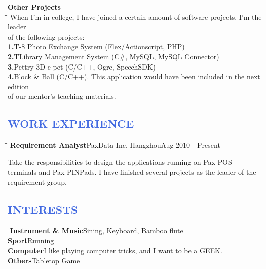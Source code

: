 \documentclass{res}
\begin{document}
\begin{resume}
\vspace{-0.1in}
\begin{tabbing}
  {\bf Other Projects}\\
  \hspace{0.3in}\= \hspace{2.6in}\= \kill
  When I’m in college, I have joined a certain amount of software projects. I\rq{}m the leader\\of the following projects:\\
  {\bf 1.}\>T-8 Photo Exchange System (Flex/Actionscript, PHP)\\
  {\bf 2.}\>TLibrary Management System (C\#, MySQL, MySQL Connector)\\
  {\bf 3.}\>Pettry 3D e-pet (C/C++, Ogre, SpeechSDK)\\
  {\bf 4.}\>Block \& Ball (C/C++). This application would have been included in the next edition\\
  \>of our mentor’s teaching materials.\\
  \end{tabbing}
\vspace{-20pt}

\textcolor{RoyalBlue}{
\section{WORK EXPERIENCE}
}
\vspace{-0.1in}
   \begin{tabbing}
   \hspace{2.3in}\= \hspace{2.6in}\= \kill
          {\bf Requirement Analyst}\>PaxData Inc. Hangzhou\>Aug 2010 - Present\\
   \end{tabbing}
   \vspace{-20pt}
   Take the responsibilities to design the applications running on Pax POS terminals and Pax PINPads. I have finished several projects as the leader of the requirement group.
   
\textcolor{RoyalBlue}{
\section{INTERESTS}
}
\vspace{-0.1in}
\begin{tabbing}
  \hspace{2.3in}\= \hspace{2.6in}\= \kill
         {\bf Instrument \& Music}\>Sining, Keyboard, Bamboo flute\\
         {\bf Sport}\>Running\\
         {\bf Computer}\>I like playing computer tricks, and I want to be a GEEK.\\
         {\bf Others}\>Tabletop Game\\
         \end{tabbing}
\vspace{-20pt}


\end{resume}
\end{document}
